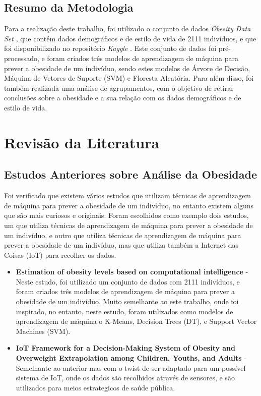 \documentclass{easychair}
\begin{document}
\subsection{Resumo da Metodologia}

Para a realização deste trabalho, foi utilizado o conjunto de dados \textit{Obesity Data Set} \cite{obesity}, que contém dados demográficos e de estilo de vida de 2111 indivíduos, e que foi disponibilizado no repositório \textit{Kaggle} \cite{kaggle}. Este conjunto de dados foi pré-processado, e foram criados três modelos de aprendizagem de máquina para prever a obesidade de um indivíduo, sendo estes modelos de Árvore de Decisão, Máquina de Vetores de Suporte (SVM) e Floresta Aleatória. Para além disso, foi também realizada uma análise de agrupamentos, com o objetivo de retirar conclusões sobre a obesidade e a sua relação com os dados demográficos e de estilo de vida.

\section{Revisão da Literatura}
\subsection{Estudos Anteriores sobre Análise da Obesidade}

Foi verificado que existem vários estudos que utilizam técnicas de aprendizagem de máquina para prever a obesidade de um indivíduo, no entanto existem alguns que são mais curiosos e originais. Foram escolhidos como exemplo dois estudos, um que utiliza técnicas de aprendizagem de máquina para prever a obesidade de um indivíduo, e outro que utiliza técnicas de aprendizagem de máquina para prever a obesidade de um indivíduo, mas que utiliza também a Internet das Coisas (IoT) para recolher os dados.

\begin{itemize}
  \item \textbf{Estimation of obesity levels based on computational intelligence} \cite{estimation} - Neste estudo, foi utilizado um conjunto de dados com 2111 indivíduos, e foram criados três modelos de aprendizagem de máquina para prever a obesidade de um indivíduo. Muito semelhante ao este trabalho, onde foi inspirado, no entanto, neste estudo, foram utilizados como modelos de aprendizagem de máquina o K-Means, Decision Trees (DT), e Support Vector Machines (SVM).
  \item \textbf{IoT Framework for a Decision-Making System of Obesity and Overweight Extrapolation among Children, Youths, and Adults} \cite{iot} - Semelhante ao anterior mas com o twist de ser adaptado para um possível sistema de IoT, onde os dados são recolhidos através de sensores, e são utilizados para meios estrategicos de saúde pública.
\end{itemize}
\end{document}
